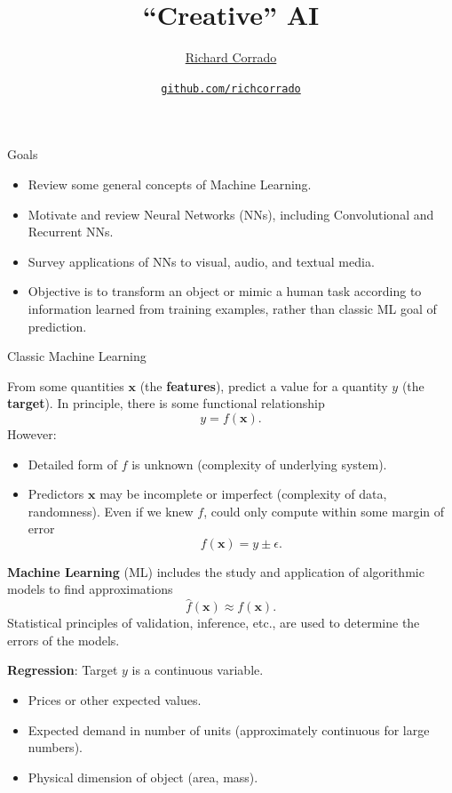 \documentclass[12pt,t]{beamer}
\title{``Creative'' AI}
\author{\href{http://richcorrado.github.io}{Richard Corrado}}
\institute{Fat Cat Machine Learning}
\date{\href{https://github.com/richcorrado}{\tt \scriptsize github.com/richcorrado}}
\begin{document}
{
	\frame{
		\titlepage
} } 
	


\begin{frame}{Goals}

\begin{itemize}
\item Review some general concepts of Machine Learning.
\item Motivate and review Neural Networks (NNs), including Convolutional and Recurrent NNs.
\item Survey applications of NNs to visual, audio, and textual media.
\item Objective is to transform an object or mimic a human task according to information learned from training examples, rather than classic ML goal of prediction.
\end{itemize}


\end{frame}

\begin{frame}{Classic Machine Learning}

From some quantities $\mathbf{x}$ (the {\bf features}), predict a value for a quantity $y$ (the {\bf target}).   In principle, there is some functional relationship
$$ y = f(\mathbf{x}).$$
However:
\begin{itemize}
\item Detailed form of $f$ is unknown (complexity of underlying system).
\item Predictors $\mathbf{x}$ may be incomplete or imperfect (complexity of data, randomness). Even if we knew $f$,  could only compute within some margin of error
$$ f(\mathbf{x}) = y \pm \epsilon.$$
\end{itemize}

\end{frame}

\begin{frame}

{\bf Machine Learning} (ML)  includes the study and application of algorithmic models to find approximations  
$$ \hat{f}(\mathbf{x} )\approx f(\mathbf{x}). $$
Statistical principles of validation, inference, etc., are used to determine the errors of the models.


\bigskip

{\bf Regression}: Target $y$ is a continuous variable.
\begin{itemize}
\item Prices or other expected values. 
\item Expected demand in number of units  (approximately continuous for large numbers).
\item Physical dimension of object (area, mass).
\end{itemize}

\end{frame}
\end{document}
